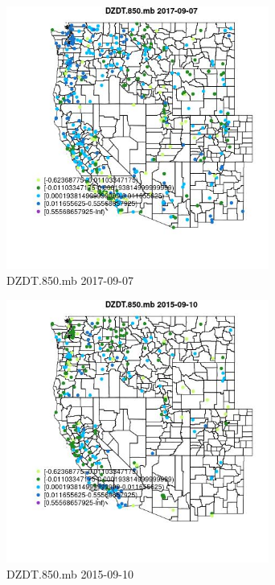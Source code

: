 \begin{figure} 
\centering  
\includegraphics[width=0.77\textwidth]{Code_Outputs/Report_ML_input_PM25_Step4_part_e_de_duplicated_aves_compiled_2019-05-21wNAs_MapObsDZDT850mb2017-09-07.jpg} 
\caption{\label{fig:Report_ML_input_PM25_Step4_part_e_de_duplicated_aves_compiled_2019-05-21wNAsMapObsDZDT850mb2017-09-07}DZDT.850.mb 2017-09-07} 
\end{figure} 
 

\begin{figure} 
\centering  
\includegraphics[width=0.77\textwidth]{Code_Outputs/Report_ML_input_PM25_Step4_part_e_de_duplicated_aves_compiled_2019-05-21wNAs_MapObsDZDT850mb2015-09-10.jpg} 
\caption{\label{fig:Report_ML_input_PM25_Step4_part_e_de_duplicated_aves_compiled_2019-05-21wNAsMapObsDZDT850mb2015-09-10}DZDT.850.mb 2015-09-10} 
\end{figure} 
 

